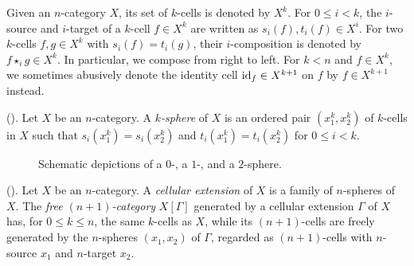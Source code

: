 \documentclass[reqno,12pt]{amsart}
\begin{document}
Given an $n$-category $X$, its set of $k$-cells is denoted by $X^k$. For $0\leq i<k$, the $i$-source and $i$-target of a $k$-cell $f\in X^k$ are written as $s_i(f),t_i(f)\in X^i$. For two $k$-cells $f,g\in X^k$ with $s_i(f)=t_i(g)$, their $i$-composition is denoted by $f\star_i g\in X^k$. In particular, we compose from right to left. For $k<n$ and $f\in X^k$, we sometimes abusively denote the identity cell ${\operatorname{id}}_f\in X^{k+1}$ on $f$ by $f\in X^{k+1}$ instead.

\begin{definition}(\cite[\S 1.1.2]{GuMa12}).
	Let \(X\) be an \(n\)-category. A \emph{\(k\)-sphere} of \(X\) is an ordered pair \((x^{k}_1,x^{k}_2)\) of \(k\)-cells in $X$ such that $s_{i}(x^{k}_1)=s_{i}(x^{k}_2)$ and $t_{i}(x^{k}_1)=t_{i}(x^{k}_2)$ for $0\leq i<k$.
\end{definition}
\vspace{-0.41cm}
\begin{figure}[H]
\caption{Schematic depictions of a $0$-, a $1$-, and a $2$-sphere.}
\label{fig:spheres}
\end{figure}

\begin{definition}(\cite[\S 1.1.2]{GuMa12}).
Let \(X\) be an \(n\)-category. A \emph{cellular extension} of \(X\) is a family of \(n\)-spheres of \(X\). The \emph{free \((n+1)\)-category} \(X[\Gamma]\) generated by a cellular extension \(\Gamma\) of \(X\) has, for \(0\leq k\leq n\), the same \(k\)-cells as \(X\), while its \((n+1)\)-cells are freely generated by the \(n\)-spheres \((x_1,x_2)\) of \(\Gamma\), regarded as \((n+1)\)-cells with $n$-source \(x_1\) and $n$-target \(x_2\).
\end{definition}
\end{document}
